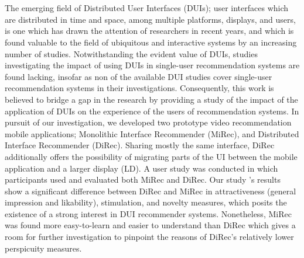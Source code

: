 \chapter{\abstractname}
The emerging field of Distributed User Interfaces (DUIs); user
interfaces which are distributed in time and space, among multiple platforms, displays, and
users, is one which has drawn the attention of researchers in recent years, and
which is found valuable to the field of ubiquitous and
interactive systems by an increasing number of studies. Notwithstanding the
evident value of DUIs, studies investigating the impact of using DUIs in
single-user recommendation systems are found lacking, insofar as non of the available DUI studies cover single-user
recommendation systems in their investigations. Consequently, this work is
believed to bridge a gap in the research by providing a study of the impact of
the application of DUIs on the experience of the users of
recommendation systems. In pursuit of our investigation, we developed two
prototype video recommendation mobile applications; Monolithic Interface
Recommender (MiRec), and Distributed Interface Recommender (DiRec). Sharing
mostly the same interface, DiRec additionally offers
the possibility of migrating parts of the UI between the mobile application and
a larger display (LD).
A user study was conducted in which participants used and evaluated both MiRec
and DiRec. Our study 's results
show a significant difference between DiRec and MiRec in attractiveness (general
impression and likability), stimulation, and novelty measures, which posits the
existence of a strong interest in DUI recommender systems. Nonetheless, MiRec
was found more easy-to-learn and easier to understand than DiRec
which gives a room for further investigation to pinpoint the reasons of DiRec's
relatively lower perspicuity measures.

